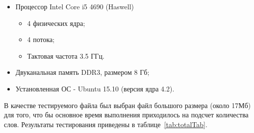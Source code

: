 \documentclass[12pt,a4paper]{report}
\begin{document}
				\begin{itemize}
					\item Процессор Intel Core i5 4690 (Haswell)
						\begin{itemize}
							\item 4 физических ядра;
							\item 4 потока;
							\item Тактовая частота 3.5 ГГц.
						\end{itemize}
					\item Двуканальная память DDR3, размером 8 Гб;
					\item Установленная ОС - Ubuntu 15.10 (версия ядра 4.2).
				\end{itemize}
				В качестве тестируемого файла был выбран файл большого размера (около 
				17Мб) для того, что бы основное время выполнения приходилось на подсчет 
				количества слов. Результаты тестирования приведены в 				
				таблице~\ref{tab:totalTab}.
\end{document}
